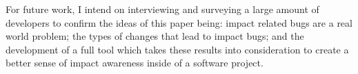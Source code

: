 \documentclass[conference]{IEEEtran}
\begin{document}
For future work, I intend on interviewing and surveying a large amount of developers
to confirm the ideas of this paper being: impact related bugs are a real world problem; the
types of changes that lead to impact bugs; and the development of a full tool which takes
these results into consideration to create a better sense of impact awareness inside of
a software project.





\end{document}
